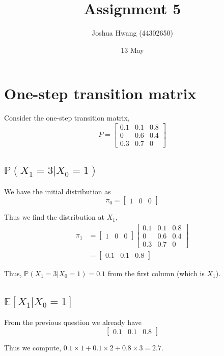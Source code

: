 \documentclass{article}
\title{Assignment 5}
\author{Joshua Hwang (44302650)}
\date{13 May}
\newcommand{\prob}{\mathbb{P}}
\newcommand{\expect}{\mathbb{E}}
\begin{document}
\maketitle

\section{One-step transition matrix}
Consider the one-step transition matrix,
\[
    P =
    \begin{bmatrix}
        0.1 & 0.1 & 0.8 \\
          0 & 0.6 & 0.4 \\
        0.3 & 0.7 &   0
    \end{bmatrix}
\]

\subsection{$\prob(X_1 = 3 | X_0 = 1)$}
We have the initial distribution as
\[
    \pi_0 =
    \begin{bmatrix}
        1 & 0 & 0
    \end{bmatrix}
\]

Thus we find the distribution at $X_1$,
\begin{align*}
    \pi_1
    &=
    \begin{bmatrix}
        1 & 0 & 0
    \end{bmatrix}
    \begin{bmatrix}
        0.1 & 0.1 & 0.8 \\
          0 & 0.6 & 0.4 \\
        0.3 & 0.7 &   0
    \end{bmatrix} \\
    &=
    \begin{bmatrix}
        0.1 & 0.1 & 0.8
    \end{bmatrix}
\end{align*}

Thus, $\prob(X_1 = 3 | X_0 = 1) = 0.1$ from the first column (which is $X_1$).

\subsection{$\expect[X_1 | X_0 = 1]$}
From the previous question we already have
\[
    \begin{bmatrix}
        0.1 & 0.1 & 0.8
    \end{bmatrix}
\]

Thus we compute, $0.1 \times 1 + 0.1 \times 2 + 0.8 \times 3 = 2.7$.
\end{document}
